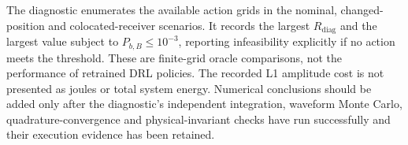 The diagnostic enumerates the available action grids in the nominal, changed-position and colocated-receiver scenarios. It records the largest $R_{\mathrm{diag}}$ and the largest value subject to $P_{b,B}\leq10^{-3}$, reporting infeasibility explicitly if no action meets the threshold. These are finite-grid oracle comparisons, not the performance of retrained DRL policies. The recorded L1 amplitude cost is not presented as joules or total system energy. Numerical conclusions should be added only after the diagnostic's independent integration, waveform Monte Carlo, quadrature-convergence and physical-invariant checks have run successfully and their execution evidence has been retained.
